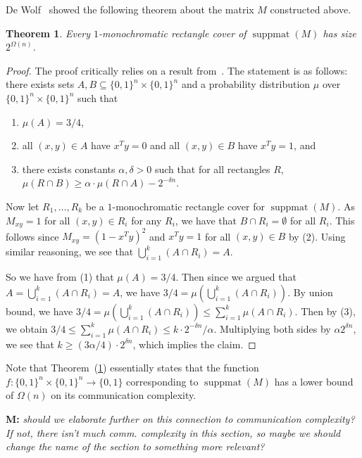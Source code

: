 \documentclass{article}
\newtheorem{theorem}{\sc Theorem}
\theoremstyle{definition}
\theoremstyle{remark}
\newcommand{\bits}{\{0,1\}}
\newcommand{\suppmat}{\operatorname{suppmat}}
\newcommand{\mnote}[1]{{\color{blue}\noindent\textbf{M: }\marginpar{****}\textit{{#1}}}}
\begin{document}
De Wolf~\cite{de-wolf} showed the following theorem about the matrix $M$ constructed above.
\begin{theorem}\label{theor:dewolf}
Every $1$-monochromatic rectangle cover of $\suppmat(M)$ has size $2^{\Omega(n)}$.
\end{theorem}
\begin{proof}
The proof critically relies on a result from~\cite{cc-nisan}. The statement is as follows: there exists sets $A, B \subseteq \bits^n \times \bits^n$ and a probability distribution $\mu$ over $\bits^n \times \bits^n$ such that 
\begin{enumerate}\itemsep0pt
\item $\mu(A) = 3/4$,
\item all $(x,y) \in A$ have $x^Ty =0$ and all $(x,y) \in B$ have $x^Ty = 1$, and 
\item there exists constants $\alpha, \delta > 0$ such that for all rectangles $R$,  $\mu(R \cap B) \ge \alpha \cdot \mu(R \cap A) - 2^{-\delta n}$.
\end{enumerate}

Now let $R_1, \ldots, R_k$ be a $1$-monochromatic rectangle cover for $\suppmat(M)$. As $M_{xy} = 1$ for all $(x,y) \in R_i$ for any $R_i$, we have that $B \cap R_i = \emptyset$ for all $R_i$. This follows since $M_{xy} = (1 - x^Ty)^2$ and $x^Ty = 1$ for all $(x,y) \in B$ by (2). Using similar reasoning, we see that $\bigcup_{i=1}^k (A \cap R_i) = A$. 

So we have from (1) that $\mu(A) = 3/4$. Then since we argued that $A = \bigcup_{i=1}^k (A \cap R_i) = A$, we have $3/4 = \mu(\bigcup_{i=1}^k (A \cap R_i))$. By union bound, we have $3/4 = \mu(\bigcup_{i=1}^k (A \cap R_i)) \le \sum_{i=1}^k \mu(A \cap R_i)$. Then by (3), we obtain $3/4 \le \sum_{i=1}^k \mu(A \cap R_i) \le k\cdot 2^{-\delta n} /\alpha$. Multiplying both sides by $\alpha2^{\delta n}$, we see that $k \ge (3\alpha/4)\cdot2^{\delta n}$, which implies the claim.
\end{proof}

Note that Theorem~(\ref{theor:dewolf}) essentially states that the function $f : \bits^n \times \bits^n \to \bits$ corresponding to $\suppmat(M)$ has a lower bound of $\Omega(n)$ on its communication complexity.

\mnote{should we elaborate further on this connection to communication complexity? If not, there isn't much comm. complexity in this section, so maybe we should change the name of the section to something more relevant?}
\end{document}

